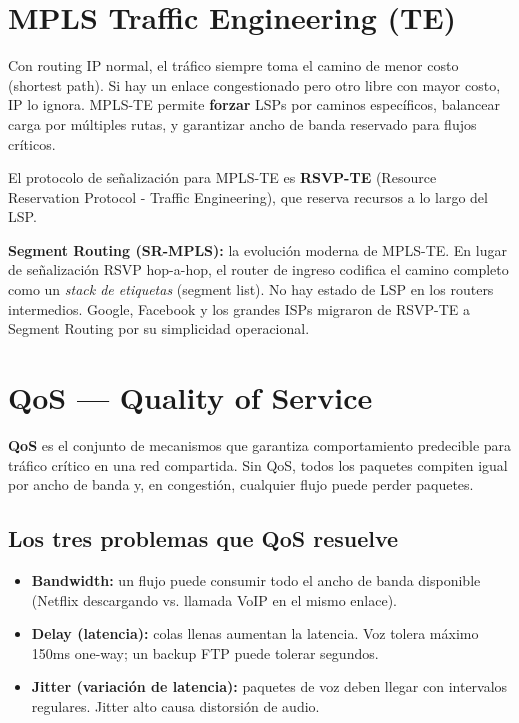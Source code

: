 \section{ MPLS Traffic Engineering (TE)}

\begin{concepto}
Con routing IP normal, el tráfico siempre toma el camino de menor costo (shortest path).
Si hay un enlace congestionado pero otro libre con mayor costo, IP lo ignora. MPLS-TE
permite \textbf{forzar} LSPs por caminos específicos, balancear carga por múltiples
rutas, y garantizar ancho de banda reservado para flujos críticos.

El protocolo de señalización para MPLS-TE es \textbf{RSVP-TE} (Resource Reservation
Protocol - Traffic Engineering), que reserva recursos a lo largo del LSP.
\end{concepto}

\begin{moderno}
 \textbf{Segment Routing (SR-MPLS):} la evolución moderna de MPLS-TE.
En lugar de señalización RSVP hop-a-hop, el router de ingreso codifica el camino
completo como un \emph{stack de etiquetas} (segment list). No hay estado de LSP en
los routers intermedios. Google, Facebook y los grandes ISPs migraron de RSVP-TE
a Segment Routing por su simplicidad operacional.
\end{moderno}

\section{ QoS --- Quality of Service}

\begin{concepto}
\textbf{QoS} es el conjunto de mecanismos que garantiza comportamiento predecible
para tráfico crítico en una red compartida. Sin QoS, todos los paquetes compiten
igual por ancho de banda y, en congestión, cualquier flujo puede perder paquetes.
\end{concepto}

\subsection{Los tres problemas que QoS resuelve}

\begin{cuidado}
\begin{itemize}
    \item \textbf{Bandwidth:} un flujo puede consumir todo el ancho de banda disponible
          (Netflix descargando vs. llamada VoIP en el mismo enlace).
    \item \textbf{Delay (latencia):} colas llenas aumentan la latencia. Voz tolera máximo
          150ms one-way; un backup FTP puede tolerar segundos.
    \item \textbf{Jitter (variación de latencia):} paquetes de voz deben llegar con
          intervalos regulares. Jitter alto causa distorsión de audio.
\end{itemize}
\end{cuidado}

